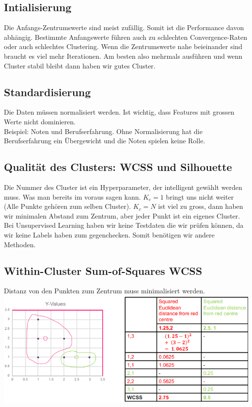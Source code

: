 \subsection{Intialisierung}
Die Anfangs-Zentrumswerte sind meist zufällig. Somit ist die Performance davon abhängig. Bestimmte Anfangswerte führen auch zu schlechten Convergence-Raten oder auch schlechtes Clustering. Wenn die Zentrumswerte nahe beieinander sind braucht es viel mehr Iterationen. Am besten also mehrmals ausführen und wenn Cluster stabil bleibt dann haben wir gutes Cluster.
\subsection{Standardisierung}
Die Daten müssen normalisiert werden. Ist wichtig, dass Features mit grossen Werte nicht dominieren.\\
Beispiel: Noten und Berufserfahrung. Ohne Normalisierung hat die Berufserfahrung ein Übergewicht und die Noten spielen keine Rolle.
\subsection{Qualität des Clusters: WCSS und Silhouette}
Die Nummer des Cluster ist ein Hyperparameter, der intelligent gewählt werden muss. Was man bereits im voraus sagen kann. $K_c = 1$ bringt uns nicht weiter (Alle Punkte gehören zum selben Cluster). $K_c = N$ ist viel zu gross, dann haben wir minimalen Abstand zum Zentrum, aber jeder Punkt ist ein eigenes Cluster. Bei Unsupervised Learning haben wir keine Testdaten die wir prüfen können, da wir keine Labels haben zum gegenchecken.
Somit benötigen wir andere Methoden.
\subsection{Within-Cluster Sum-of-Squares WCSS}
Distanz von den Punkten zum Zentrum muss minimalisiert werden.
\includegraphics[width=\linewidth]{img/wcss.png}

